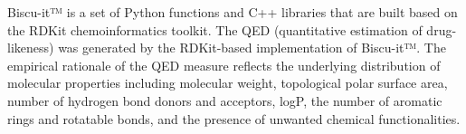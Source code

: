Biscu-it™ is a set of Python functions and C++ libraries that are built based on the RDKit chemoinformatics toolkit. The QED (quantitative estimation of drug-likeness) was generated by the RDKit-based implementation of Biscu-it™. The empirical rationale of the QED measure reflects the underlying distribution of molecular properties including molecular weight, topological polar surface area, number of hydrogen bond donors and acceptors, logP, the number of aromatic rings and rotatable bonds, and the presence of unwanted chemical functionalities. 